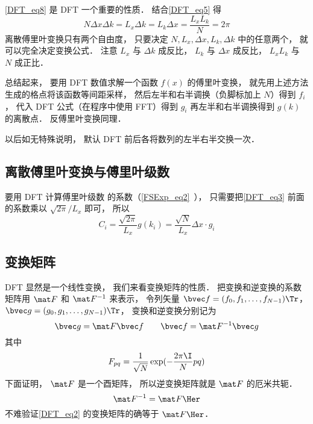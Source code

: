\autoref{DFT_eq8} 是 DFT 一个重要的性质． 结合\autoref{DFT_eq5} 得
\begin{equation}\label{DFT_eq9}
N\Delta x \Delta k = L_x \Delta k = L_k \Delta x = \frac{L_x L_k}{N} = 2\pi
\end{equation}
离散傅里叶变换只有两个自由度， 只要决定 $N, L_x, \Delta x, L_k, \Delta k$ 中的任意两个， 就可以完全决定变换公式． 注意 $L_x$ 与 $\Delta k$ 成反比， $L_k$ 与 $\Delta x$ 成反比， $L_xL_k$ 与 $N$ 成正比．

总结起来， 要用 DFT 数值求解一个函数 $f(x)$ 的傅里叶变换， 就先用上述方法生成的格点将该函数等间距采样， 然后左半和右半调换（负脚标加上 $N$）得到 $f_i$， 代入 DFT 公式（在程序中使用 FFT）得到 $g_i$ 再左半和右半调换得到 $g(k)$ 的离散点． 反傅里叶变换同理．

以后如无特殊说明， 默认 DFT 前后各将数列的左半右半交换一次．

\subsection{离散傅里叶变换与傅里叶级数}
要用 DFT 计算傅里叶级数 的系数（\autoref{FSExp_eq2}~）， 只需要把\autoref{DFT_eq3} 前面的系数乘以 $\sqrt{2\pi}/L_x$ 即可， 所以
\begin{equation}
C_i = \frac{\sqrt{2\pi}}{L_x} g(k_i) = \frac{\sqrt{N}}{L_x} \Delta x \cdot g_i
\end{equation}

\subsection{变换矩阵}
DFT 显然是一个线性变换， 我们来看变换矩阵的性质． 把变换和逆变换的系数矩阵用
 $\mat F$ 和 $\mat F^{-1}$ 来表示， 令列矢量 $\bvec f = (f_0,f_1,\dots,f_{N-1})\Tr$， $\bvec g = (g_0,g_1,\dots,g_{N-1})\Tr$， 变换和逆变换分别记为
\begin{equation}
\bvec g = \mat F \bvec f \qquad
\bvec f = \mat F^{-1} \bvec g
\end{equation}
其中
\begin{equation}
F_{pq} = \frac{1}{\sqrt{N}} \exp(-\frac{2\pi\I}{N} p q)
\end{equation}
下面证明， $\mat F$ 是一个酉矩阵， 所以逆变换矩阵就是 $\mat F$ 的厄米共轭．
\begin{equation}
\mat F^{-1} = \mat F\Her
\end{equation}
不难验证\autoref{DFT_eq2} 的变换矩阵的确等于 $\mat F\Her$．

